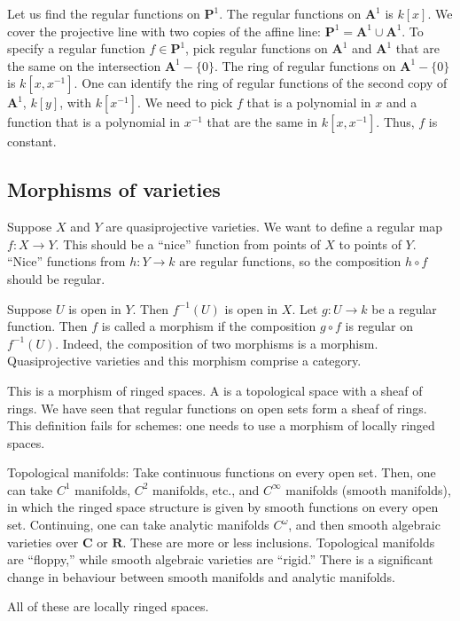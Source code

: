 \documentclass [11 pt, oneside, margin = 1 in] {article}
\begin{document}
\begin{example}[ ]\label{}\text{}
Let us find the regular functions on $\mathbf{P}^1$. The regular functions on $\mathbf{A}^1$ is $k[x]$. We cover the projective line with two copies of the affine line: $\mathbf{P}^1 = \mathbf{A}^1\cup \mathbf{A}^1$. To specify a regular function $f\in \mathbf{P}^1$, pick regular functions on $\mathbf{A}^1$ and $\mathbf{A}^1$ that are the same on the intersection $\mathbf{A}^1-\{0\}$. The ring of regular functions on $\mathbf{A}^1-\{0\}$ is $k[x,x^{-1}]$. One can identify the ring of regular functions of the second copy of $\mathbf{A}^1$, $k[y]$, with $k[x^{-1}]$. We need to pick $f$ that is a polynomial in $x$ and a function that is a polynomial in $x^{-1}$ that are the same in $k[x,x^{-1}]$. Thus, $f$ is constant.
\end{example}

\subsection{Morphisms of varieties}
Suppose $X$ and $Y$ are quasiprojective varieties. We want to define a regular map $f:X\longrightarrow Y$. This should be a ``nice'' function from points of $X$ to points of $Y$. ``Nice'' functions from $h:Y\longrightarrow k$ are regular functions, so the composition $h\circ f$ should be regular.

Suppose $U$ is open in $Y$. Then $f^{-1}(U)$ is open in $X$. Let $g: U\longrightarrow k$ be a regular function. Then $f$ is called a morphism if the composition $g\circ f$ is regular on $f^{-1}(U)$. Indeed, the composition of two morphisms is a morphism. Quasiprojective varieties and this morphism comprise a category.

\begin{warn}
	This is a morphism of ringed spaces. A  is a topological space with a sheaf of rings. We have seen that regular functions on open sets form a sheaf of rings. This definition fails for schemes: one needs to use a morphism of locally ringed spaces.
\end{warn}

\begin{example}\label{}\text{}
	 Topological manifolds: Take continuous functions on every open set. Then, one can take $C^1$ manifolds, $C^2$ manifolds, etc., and $C^\infty$ manifolds (smooth manifolds), in which the ringed space structure is given by smooth functions on every open set. Continuing, one can take analytic manifolds $C^\omega$, and then smooth algebraic varieties over $\mathbf{C}$ or $\mathbf{R}$. These are more or less inclusions. Topological manifolds are ``floppy,'' while smooth algebraic varieties are ``rigid.'' There is a significant change in behaviour between smooth manifolds and analytic manifolds.  

	 All of these are locally ringed spaces.
\end{example}
\end{document}

